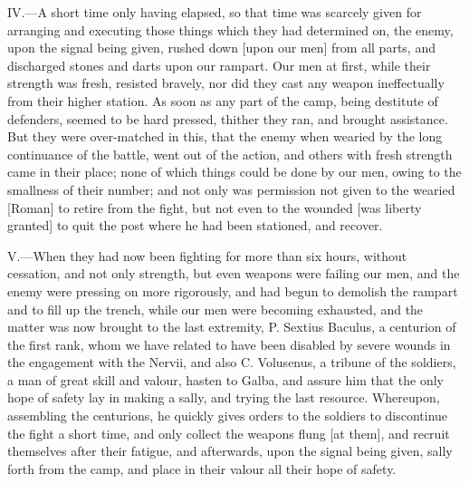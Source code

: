 IV.—A short time only having elapsed, so that time was scarcely given
for arranging and executing those things which they had determined on,
the enemy, upon the signal being given, rushed down [upon our men] from
all parts, and discharged stones and darts upon our rampart. Our men at
first, while their strength was fresh, resisted bravely, nor did they
cast any weapon ineffectually from their higher station. As soon as any
part of the camp, being destitute of defenders, seemed to be hard
pressed, thither they ran, and brought assistance. But they were
over-matched in this, that the enemy when wearied by the long continuance
of the battle, went out of the action, and others with fresh strength
came in their place; none of which things could be done by our men, owing
to the smallness of their number; and not only was permission not given
to the wearied [Roman] to retire from the fight, but not even to the
wounded [was liberty granted] to quit the post where he had been
stationed, and recover.

V.—When they had now been fighting for more than six hours, without
cessation, and not only strength, but even weapons were failing our men,
and the enemy were pressing on more rigorously, and had begun to
demolish the rampart and to fill up the trench, while our men were
becoming exhausted, and the matter was now brought to the last
extremity, P. Sextius Baculus, a centurion of the first rank, whom we
have related to have been disabled by severe wounds in the engagement
with the Nervii, and also C. Volusenus, a tribune of the soldiers, a man
of great skill and valour, hasten to Galba, and assure him that the only
hope of safety lay in making a sally, and trying the last resource.
Whereupon, assembling the centurions, he quickly gives orders to the
soldiers to discontinue the fight a short time, and only collect the
weapons flung [at them], and recruit themselves after their fatigue, and
afterwards, upon the signal being given, sally forth from the camp, and
place in their valour all their hope of safety.

